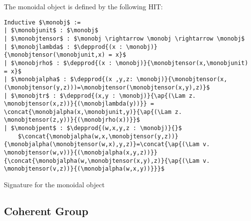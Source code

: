 The monoidal object is defined by the following HIT:
\begin{lstlisting}[mathescape=true]
Inductive $\monobj$ :=
| $\monobjunit$ : $\monobj$
| $\monobjtensor$ : $\monobj \rightarrow \monobj \rightarrow \monobj$
| $\monobjlambda$ : $\depprod{(x : \monobj)}{\monobjtensor(\monobjunit,x) = x}$
| $\monobjrho$ : $\depprod{(x : \monobj)}{\monobjtensor(x,\monobjunit) = x}$
| $\monobjalpha$ : $\depprod{(x ,y,z: \monobj)}{\monobjtensor(x,(\monobjtensor(y,z)))=\monobjtensor(\monobjtensor(x,y),z)}$
| $\monobjtr$ : $\depprod{(x,y : \monobj)}{\ap{(\Lam z. \monobjtensor(x,z))}{(\monobjlambda(y))}} = \concat{\monobjalpha(x,\monobjunit,y)}{\ap{(\Lam z. \monobjtensor(z,y))}{(\monobjrho(x))}}$
| $\monobjpent$ : $\depprod{(w,x,y,z : \monobj)}{}$
    $\concat{\monobjalpha(w,x,\monobjtensor(y,z))}{\monobjalpha(\monobjtensor(w,x),y,z)}=\concat{\ap{(\Lam v. \monobjtensor(w,v))}{(\monobjalpha(x,y,z))}}{\concat{\monobjalpha(w,\monobjtensor(x,y),z)}{\ap{(\Lam v. \monobjtensor(v,z))}{(\monobjalpha(w,x,y))}}}$
\end{lstlisting}

Signature for the monoidal object

\subsection{Coherent Group}
\label{sec:coeherent_group}

